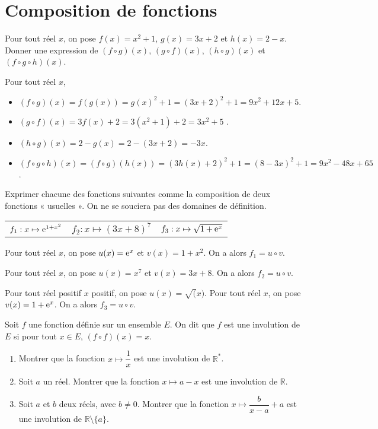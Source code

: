 \documentclass[11pt,fleqn]{book} %
\begin{document}
\section*{Composition de fonctions}

\begin{exercise}Pour tout réel $x$, on pose $f(x)=x^2+1$, $g(x)=3x+2$ et $h(x)=2-x$.\\
\noindent Donner une expression de $(f \circ g) (x)$, $(g \circ f) (x)$, $(h \circ g) (x)$ et   $(f \circ g \circ h) (x)$.
\end{exercise}

\begin{solution}Pour tout réel $x$,
\begin{itemize}
\item  $(f \circ g) (x)=f(g(x))=g(x)^2+1=(3x+2)^2+1=9x^2+12x+5$.
\vskip5pt
\item   $(g \circ f) (x)=3f(x)+2=3(x^2+1)+2=3x^2+5$ .
\vskip5pt
\item  $(h \circ g) (x)=2-g(x)=2-(3x+2)=-3x$.
\vskip5pt
\item $(f \circ g \circ h) (x)=(f \circ g)(h(x))=(3h(x)+2)^2+1=(8-3x)^2+1=9x^2-48x+65$.
\end{itemize}
\end{solution}

\begin{exercise}Exprimer chacune des fonctions suivantes comme la composition de deux fonctions « usuelles ». On ne se souciera pas des domaines de définition.

\renewcommand{\arraystretch}{2}
\begin{tabularx}{\linewidth}{XXX}
 $f_1 : x \mapsto \mathrm{e}^{1+x^2}$&
 $f_2 : x \mapsto (3x+8)^7$&
  $f_3 : x \mapsto \sqrt{1+\mathrm{e}^x}$ \\
\end{tabularx}
\end{exercise}

\begin{solution}
Pour tout réel $x$, on pose $u(x)=\mathrm{e}^x$ et $v(x)=1+x^2$. On a alors $f_1=u \circ v$.

Pour tout réel $x$, on pose $u(x)=x^7$ et $v(x)=3x+8$. On a alors $f_2=u \circ v$.

Pour tout réel positif $x$ positif, on pose $u(x)=\sqrt(x)$. Pour tout réel $x$, on pose $v(x)=1+\mathrm{e}^x$. On a alors $f_3=u \circ v$.
\end{solution}

\begin{exercise}Soit $f$ une fonction définie sur un ensemble $E$. On dit que $f$ est une involution de $E$ si pour tout $x\in E$, $(f \circ f)(x)=x$.
\begin{enumerate}
\item Montrer que la fonction $x\mapsto \dfrac{1}{x}$ est une involution de $\mathbb{R}^*$.
\item Soit $a$ un réel. Montrer que la fonction $x\mapsto a-x$ est une involution de $\mathbb{R}$.
\item Soit $a$ et $b$ deux réels, avec $b\neq 0$. Montrer que la fonction $x\mapsto \dfrac{b}{x-a}+a$ est une involution de $\mathbb{R}\setminus \{a\}$.
\end{enumerate}\end{exercise}
\end{document}
